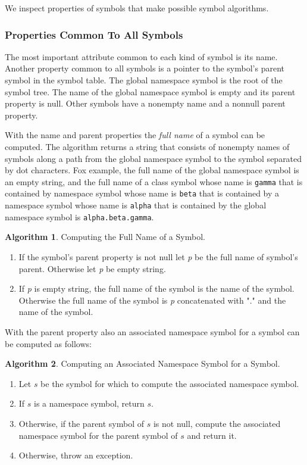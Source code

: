 \documentclass[a4paper,oneside,11pt]{book}
\theoremstyle{definition}
\newtheorem{algo}{Algorithm}[section]
\begin{document}
We inspect properties of symbols that make possible symbol algorithms.

\subsubsection{Properties Common To All Symbols}

The most important attribute common to each kind of symbol is its name.
Another property common to all symbols is a pointer to the symbol's parent symbol in the symbol table.
The global namespace symbol is the root of the symbol tree.
The name of the global namespace symbol is empty and its parent property is null.
Other symbols have a nonempty name and a nonnull parent property.

With the name and parent properties the \emph{full name} of a symbol can be computed.
The algorithm returns a string that consists of nonempty names of symbols along a path from the global namespace symbol to
the symbol separated by dot characters. Fox example, the full name of the global namespace symbol is an empty string, and
the full name of a class symbol whose name is \texttt{gamma} that is contained by namespace symbol whose name is \texttt{beta} that is
contained by a namespace symbol whose name is \texttt{alpha} that is contained by the global namespace symbol is \texttt{alpha.beta.gamma}.

\begin{algo} Computing the Full Name of a Symbol.
\begin{enumerate}
\item
If the symbol's parent property is not null let \emph{p} be the full name of symbol's parent.
Otherwise let \emph{p} be empty string.

\item
If \emph{p} is empty string, the full name of the symbol is the name of the symbol.
Otherwise the full name of the symbol is \emph{p} concatenated with "." and the name of the symbol.
\end{enumerate}

\end{algo}

With the parent property also an associated namespace symbol for a symbol can be computed as follows:

\begin{algo}\label{associatedns} Computing an Associated Namespace Symbol for a Symbol.
\begin{enumerate}
\item
Let $s$ be the symbol for which to compute the associated namespace symbol.
\item
If $s$ is a namespace symbol, return $s$.
\item
Otherwise, if the parent symbol of $s$ is not null, compute the associated namespace symbol for the parent symbol of $s$
and return it.
\item
Otherwise, throw an exception.
\end{enumerate}
\end{algo}
\end{document}
